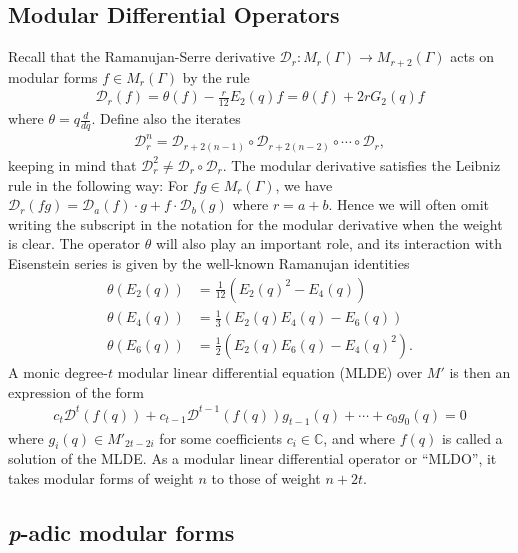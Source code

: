 \documentclass[10pt,a4paper]{amsart}
\numberwithin{equation}{section}
\theoremstyle{definition}
\begin{document}
\subsection{Modular Differential Operators}
Recall that the Ramanujan-Serre derivative $\mathcal{D}_{r}: M_{r}(\Gamma) \to M_{r+2}(\Gamma)$ acts on modular forms $f \in M_{r}(\Gamma)$ by the rule
\begin{align}
    \mathcal{D}_{r} (f) = \theta (f) - \frac{r}{12} E_{2}(q) f = \theta(f) + 2r G_{2}(q)f \label{modularderdef}
\end{align}
where $\theta = q \frac{d}{dq}$. Define also the iterates
\begin{align*}
    \mathcal{D}_{r}^{n} = \mathcal{D}_{r+2(n-1)} \circ \mathcal{D}_{r+2(n-2)} \circ \cdots \circ \mathcal{D}_{r},
\end{align*}
keeping in mind that $\mathcal{D}_{r}^{2} \neq \mathcal{D}_{r} \circ \mathcal{D}_{r}$. The modular derivative satisfies the Leibniz rule in the following way: For $fg \in M_{r}(\Gamma)$, we have $\mathcal{D}_{r}(fg) = \mathcal{D}_{a}(f) \cdot g + f \cdot \mathcal{D}_{b}(g)$ where $r=a+b$. Hence we will often omit writing the subscript in the notation for the modular derivative when the weight is clear. The operator $\theta$ will also play an important role, and its interaction with Eisenstein series is given by the well-known Ramanujan identities
\begin{align}
    \theta (E_{2}(q)) &= \frac{1}{12} \left( E_{2}(q)^{2} - E_{4}(q) \right) \label{ram1} \\
    \theta (E_{4}(q)) &= \frac{1}{3} \left( E_{2}(q)E_{4}(q) - E_{6}(q) \right) \label{ram2} \\
    \theta (E_{6}(q)) &= \frac{1}{2} \left( E_{2}(q)E_{6}(q) - E_{4}(q)^{2} \right). \label{ram3}
\end{align} 
A monic degree-$t$ modular linear differential equation (MLDE) over $M'$ is then an expression of the form
\begin{align*}
    c_{t} \mathcal{D}^{t}(f(q)) + c_{t-1} \mathcal{D}^{t-1}(f(q)) g_{t-1}(q) + \cdots + c_{0} g_{0}(q) = 0
\end{align*}
where $g_{i}(q) \in M'_{2t-2i}$ for some coefficients $c_{i} \in \mathbb{C}$, and where $f(q)$ is called a solution of the MLDE. As a modular linear differential operator or ``MLDO'', it takes modular forms of weight $n$ to those of weight $n+2t$. \par 


\subsection{\textit{p}-adic modular forms} \label{Subsection: padicforms}
\end{document}
